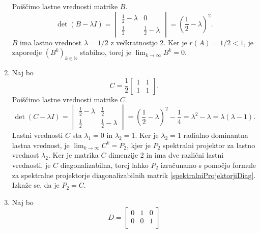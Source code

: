 \documentclass[mat1]{fmfdelo}
\newcommand{\N}{\mathbb N}
\begin{document}
\begin{zgled}
\begin{enumerate}
\begin{equation*}
        \end{equation*}
        Poiščimo lastne vrednosti matrike $B$.
        \begin{equation*}
            \det (B - \lambda I) =
            \begin{vmatrix}
                \frac{1}{2}-\lambda & 0 \\
                \frac{1}{2} & \frac{1}{2}-\lambda
            \end{vmatrix}
            = (\frac{1}{2}-\lambda)^2.
        \end{equation*}
        $B$ ima lastno vrednost $\lambda = 1/2$ z večkratnostjo 2. Ker je $r(A) = 1/2 < 1$, je zaporedje $(B^k)_{k\in\N}$ stabilno, torej je $\lim_{k\rightarrow\infty} B^k = 0$.
        \item Naj bo
        \begin{equation*}
            C = \frac{1}{2}
            \begin{bmatrix}
                1 & 1 \\
                1 & 1
            \end{bmatrix}.
        \end{equation*}
        Poiščimo lastne vrednosti matrike $C$.
        \begin{equation*}
            \det (C - \lambda I) =
            \begin{vmatrix}
                \frac{1}{2}-\lambda & \frac{1}{2} \\
                \frac{1}{2} & \frac{1}{2}-\lambda
            \end{vmatrix}
            = (\frac{1}{2}-\lambda)^2-\frac{1}{4} = \lambda^2-\lambda = \lambda(\lambda - 1).
        \end{equation*}
        Lastni vrednosti $C$ sta $\lambda_1 = 0$ in $\lambda_2 = 1$. Ker je $\lambda_2 = 1$ radialno dominantna lastna vrednost, je $\lim_{k\rightarrow\infty} C^k = P_2$, kjer je $P_2$ spektralni projektor za lastno vrednost $\lambda_2$. Ker je matrika $C$ dimenzije 2 in ima dve različni lastni vrednosti, je $C$ diagonalizabilna, torej lahko $P_2$ izračunamo s pomočjo formule za spektralne projektorje diagonalizabilnih matrik \eqref{spektralniProjektorjiDiag}. Izkaže se, da je $P_2 = C$.
        \item Naj bo
        \begin{equation*}
            D =
            \begin{bmatrix}
                0 & 1 & 0 \\
                0 & 0 & 1 \\

\end{bmatrix}
\end{equation*}
\end{enumerate}
\end{zgled}
\end{document}
